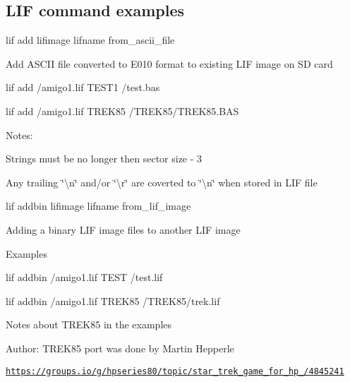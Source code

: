 \subsection*{L\+IF command examples}


\begin{DoxyItemize}
\item lif add lifimage lifname from\+\_\+ascii\+\_\+file
\begin{DoxyItemize}
\item Add A\+S\+C\+II file converted to E010 format to existing L\+IF image on SD card
\begin{DoxyItemize}
\item lif add /amigo1.lif T\+E\+S\+T1 /test.bas
\item lif add /amigo1.lif T\+R\+E\+K85 /\+T\+R\+E\+K85/\+T\+R\+E\+K85.B\+AS
\end{DoxyItemize}
\item Notes\+:
\begin{DoxyItemize}
\item Strings must be no longer then sector size -\/ 3
\item Any trailing \char`\"{}\textbackslash{}n\char`\"{} and/or \char`\"{}\textbackslash{}r\char`\"{} are coverted to \char`\"{}\textbackslash{}n\char`\"{} when stored in L\+IF file
\end{DoxyItemize}
\end{DoxyItemize}
\item lif addbin lifimage lifname from\+\_\+lif\+\_\+image
\begin{DoxyItemize}
\item Adding a binary L\+IF image files to another L\+IF image
\item Examples
\begin{DoxyItemize}
\item lif addbin /amigo1.lif T\+E\+ST /test.lif
\item lif addbin /amigo1.lif T\+R\+E\+K85 /\+T\+R\+E\+K85/trek.lif
\end{DoxyItemize}
\item Notes about T\+R\+E\+K85 in the examples
\begin{DoxyItemize}
\item Author\+: T\+R\+E\+K85 port was done by Martin Hepperle
\item \href{https://groups.io/g/hpseries80/topic/star_trek_game_for_hp_85/4845241}{\tt https\+://groups.\+io/g/hpseries80/topic/star\+\_\+trek\+\_\+game\+\_\+for\+\_\+hp\+\_/4845241}
\end{DoxyItemize}

\end{DoxyItemize}
\end{DoxyItemize}
